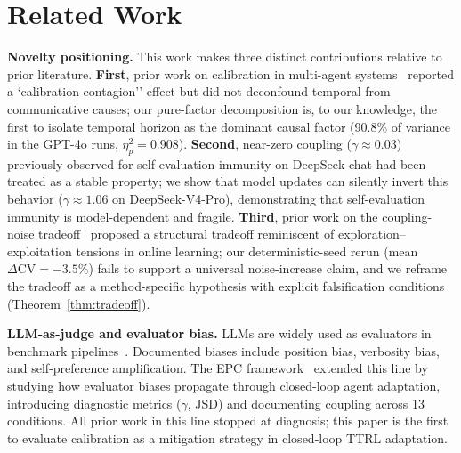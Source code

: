 \documentclass[11pt]{article}
\newcommand{\CV}{\ensuremath{\mathrm{CV}}}
\theoremstyle{definition}
\theoremstyle{remark}
\begin{document}


\section{Related Work}

\textbf{Novelty positioning.} This work makes three distinct contributions relative to prior literature. \textbf{First}, prior work on calibration in multi-agent systems~\citep{huang2026cagecal,epc2026} reported a `calibration contagion'' effect but did not deconfound temporal from communicative causes; our pure-factor decomposition is, to our knowledge, the first to isolate temporal horizon as the dominant causal factor (90.8\% of variance in the GPT-4o runs, $\eta^2_p = 0.908$). \textbf{Second}, near-zero coupling ($\gamma \approx 0.03$) previously observed for self-evaluation immunity on DeepSeek-chat had been treated as a stable property; we show that model updates can silently invert this behavior ($\gamma \approx 1.06$ on DeepSeek-V4-Pro), demonstrating that self-evaluation immunity is model-dependent and fragile. \textbf{Third}, prior work on the coupling-noise tradeoff~\citep{caleffects2026,bubeck2012regret} proposed a structural tradeoff reminiscent of exploration--exploitation tensions in online learning; our deterministic-seed rerun (mean $\Delta\CV = -3.5\%$) fails to support a universal noise-increase claim, and we reframe the tradeoff as a method-specific hypothesis with explicit falsification conditions (Theorem~\ref{thm:tradeoff}).

\textbf{LLM-as-judge and evaluator bias.} LLMs are widely used as evaluators in benchmark pipelines~\citep{zheng2023judging,chiang2024chatbot}. Documented biases include position bias, verbosity bias, and self-preference amplification. The EPC framework~\citep{epc2026} extended this line by studying how evaluator biases propagate through closed-loop agent adaptation, introducing diagnostic metrics ($\gamma$, JSD) and documenting coupling across 13 conditions. All prior work in this line stopped at diagnosis; this paper is the first to evaluate calibration as a mitigation strategy in closed-loop TTRL adaptation.
\end{document}
